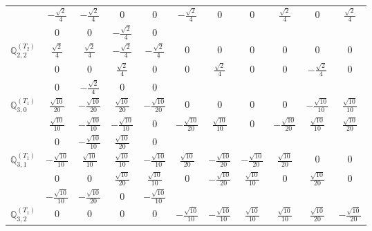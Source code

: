 \documentclass[fleqn,10pt,landscape]{article}
\begin{document}
\begin{itemize}
{\begin{center}
\begin{longtable}{ccccccccccc}
& $ - \frac{\sqrt{2}}{4} $ & $ - \frac{\sqrt{2}}{4} $ & $ 0 $ & $ 0 $ & $ - \frac{\sqrt{2}}{4} $ & $ 0 $ & $ 0 $ & $ \frac{\sqrt{2}}{4} $ & $ 0 $ & $ \frac{\sqrt{2}}{4} $ \\
& $ 0 $ & $ 0 $ & $ - \frac{\sqrt{2}}{4} $ & $ 0 $ & $  $ & $  $ & $  $ & $  $ & $  $ & $  $ \\ \hline
$\mathbb{Q}_{2,2}^{(T_{2})}$ & $ \frac{\sqrt{2}}{4} $ & $ \frac{\sqrt{2}}{4} $ & $ - \frac{\sqrt{2}}{4} $ & $ - \frac{\sqrt{2}}{4} $ & $ 0 $ & $ 0 $ & $ 0 $ & $ 0 $ & $ 0 $ & $ 0 $ \\
& $ 0 $ & $ 0 $ & $ \frac{\sqrt{2}}{4} $ & $ 0 $ & $ 0 $ & $ \frac{\sqrt{2}}{4} $ & $ 0 $ & $ 0 $ & $ - \frac{\sqrt{2}}{4} $ & $ 0 $ \\
& $ 0 $ & $ - \frac{\sqrt{2}}{4} $ & $ 0 $ & $ 0 $ & $  $ & $  $ & $  $ & $  $ & $  $ & $  $ \\ \hline
$\mathbb{Q}_{3,0}^{(T_{1})}$ & $ \frac{\sqrt{10}}{20} $ & $ - \frac{\sqrt{10}}{20} $ & $ \frac{\sqrt{10}}{20} $ & $ - \frac{\sqrt{10}}{20} $ & $ 0 $ & $ 0 $ & $ 0 $ & $ 0 $ & $ - \frac{\sqrt{10}}{10} $ & $ \frac{\sqrt{10}}{10} $ \\
& $ \frac{\sqrt{10}}{10} $ & $ - \frac{\sqrt{10}}{10} $ & $ - \frac{\sqrt{10}}{10} $ & $ 0 $ & $ - \frac{\sqrt{10}}{20} $ & $ \frac{\sqrt{10}}{10} $ & $ 0 $ & $ - \frac{\sqrt{10}}{20} $ & $ \frac{\sqrt{10}}{10} $ & $ \frac{\sqrt{10}}{20} $ \\
& $ 0 $ & $ - \frac{\sqrt{10}}{10} $ & $ \frac{\sqrt{10}}{20} $ & $ 0 $ & $  $ & $  $ & $  $ & $  $ & $  $ & $  $ \\ \hline
$\mathbb{Q}_{3,1}^{(T_{1})}$ & $ - \frac{\sqrt{10}}{10} $ & $ \frac{\sqrt{10}}{10} $ & $ \frac{\sqrt{10}}{10} $ & $ - \frac{\sqrt{10}}{10} $ & $ \frac{\sqrt{10}}{20} $ & $ - \frac{\sqrt{10}}{20} $ & $ - \frac{\sqrt{10}}{20} $ & $ \frac{\sqrt{10}}{20} $ & $ 0 $ & $ 0 $ \\
& $ 0 $ & $ 0 $ & $ \frac{\sqrt{10}}{20} $ & $ \frac{\sqrt{10}}{10} $ & $ 0 $ & $ - \frac{\sqrt{10}}{20} $ & $ \frac{\sqrt{10}}{10} $ & $ 0 $ & $ \frac{\sqrt{10}}{20} $ & $ 0 $ \\
& $ - \frac{\sqrt{10}}{10} $ & $ - \frac{\sqrt{10}}{20} $ & $ 0 $ & $ - \frac{\sqrt{10}}{10} $ & $  $ & $  $ & $  $ & $  $ & $  $ & $  $ \\ \hline
$\mathbb{Q}_{3,2}^{(T_{1})}$ & $ 0 $ & $ 0 $ & $ 0 $ & $ 0 $ & $ - \frac{\sqrt{10}}{10} $ & $ - \frac{\sqrt{10}}{10} $ & $ \frac{\sqrt{10}}{10} $ & $ \frac{\sqrt{10}}{10} $ & $ \frac{\sqrt{10}}{20} $ & $ - \frac{\sqrt{10}}{20} $ \\

\end{longtable}
\end{center}}
\end{itemize}
\end{document}
